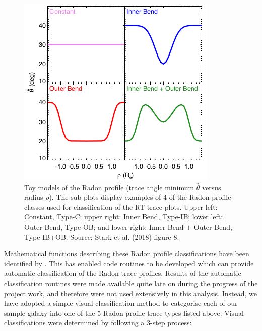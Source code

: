 \begin{figure}
    \centering
    \includegraphics[width=0.8\columnwidth]{images/RadonPlots/Radon-class-models.png}
    \caption[Radon profile class feature identification: toy models]{Toy models of the Radon profile (trace angle minimum $\hat\theta$ versus radius $\rho$). The sub-plots display examples of 4 of the Radon profile classes used for classification of the RT trace plots. Upper left: Constant, Type-C; upper right: Inner Bend, Type-IB; lower left: Outer Bend, Type-OB; and lower right: Inner Bend + Outer Bend, Type-IB+OB. Source: Stark et al. (2018) figure 8.}
    \label{fig:class-models}
\end{figure}

Mathematical functions describing these Radon profile classifications have been identified by \citet[][section 3.6]{2018MNRAS.480.2217S}. This has enabled code routines to be developed which can provide automatic classification of the Radon trace profiles. Results of the automatic classification routines were made available quite late on during the progress of the project work, and therefore were not used extensively in this analysis. Instead, we have adopted a simple visual classification method to categorise each of our sample galaxy into one of the 5 Radon profile trace types listed above. Visual classifications were determined by following a 3-step process:

